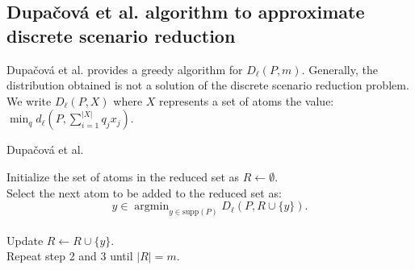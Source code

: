 \documentclass{amsart}
\newcommand{\argmin}{\mathop{\arg\min}}
\begin{document}
\subsection{Dupačová et al. algorithm to approximate discrete scenario reduction}
Dupačová et al. \cite{dupacova_scenario_2003} provides a greedy algorithm for $D_\ell\left(P,m\right)$. Generally, the distribution obtained is not a solution of the discrete scenario reduction problem. We write $D_\ell\left(P, X\right)$ where $X$ represents a set of atoms the value: $\min_{q}d_\ell\left(P,\sum_{i=1}^{\lvert X\rvert} q_jx_j\right)$.

\begin{algorithm}
  \caption{Dupačová et al.}\label{dupacova}
  Initialize the set of atoms in the reduced set as $R\gets \emptyset.$ \\ Select the next atom to be added to the reduced set as: $$ y\in\argmin_{y\in \text{supp}\left(P\right)}D_\ell\left(P,R\cup\{y\}\right).
  $$ \\
  Update $R\gets R\cup \{y\}$.\\ Repeat step 2 and 3 until $\lvert R\rvert=m$.
\end{algorithm}
\end{document}
